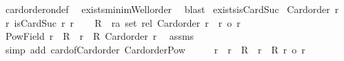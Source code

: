 \begin{isabellebody}
%
\isadelimproof
%
\endisadelimproof
%
\isatagproof
{}\isamarkupfalse%
\ card{\isacharunderscore}{\kern0pt}order{\isacharunderscore}{\kern0pt}on{\isacharunderscore}{\kern0pt}def\ \isamarkupfalse%
\ exists{\isacharunderscore}{\kern0pt}minim{\isacharunderscore}{\kern0pt}Well{\isacharunderscore}{\kern0pt}order\ \isamarkupfalse%
\ blast%
\endisatagproof
{\isafoldproof}%
%
\isadelimproof
\isanewline
%
\endisadelimproof
\isanewline
{}\isamarkupfalse%
\ exists{\isacharunderscore}{\kern0pt}isCardSuc{\isacharcolon}{\kern0pt}\isanewline
{}\ {\isachardoublequoteopen}Card{\isacharunderscore}{\kern0pt}order\ r{\isachardoublequoteclose}\isanewline
{}\ {\isachardoublequoteopen}{\isasymexists}r{\isacharprime}{\kern0pt}{\isachardot}{\kern0pt}\ isCardSuc\ r\ r{\isacharprime}{\kern0pt}{\isachardoublequoteclose}\isanewline
%
\isadelimproof
%
\endisadelimproof
%
\isatagproof
{}\isamarkupfalse%
{\isacharminus}{\kern0pt}\isanewline
\ \ \isamarkupfalse%
\ {\isacharquery}{\kern0pt}R\ {\isacharequal}{\kern0pt}\ {\isachardoublequoteopen}{\isacharbraceleft}{\kern0pt}{\isacharparenleft}{\kern0pt}r{\isacharprime}{\kern0pt}{\isacharcolon}{\kern0pt}{\isacharcolon}{\kern0pt}{\isacharprime}{\kern0pt}a\ set\ rel{\isacharparenright}{\kern0pt}{\isachardot}{\kern0pt}\ Card{\isacharunderscore}{\kern0pt}order\ r{\isacharprime}{\kern0pt}\ {\isasymand}\ r\ {\isacharless}{\kern0pt}o\ r{\isacharprime}{\kern0pt}{\isacharbraceright}{\kern0pt}{\isachardoublequoteclose}\isanewline
\ \ \isamarkupfalse%
\ {\isachardoublequoteopen}{\isacharbar}{\kern0pt}Pow{\isacharparenleft}{\kern0pt}Field\ r{\isacharparenright}{\kern0pt}{\isacharbar}{\kern0pt}\ {\isasymin}\ {\isacharquery}{\kern0pt}R\ {\isasymand}\ {\isacharparenleft}{\kern0pt}{\isasymforall}r\ {\isasymin}\ {\isacharquery}{\kern0pt}R{\isachardot}{\kern0pt}\ Card{\isacharunderscore}{\kern0pt}order\ r{\isacharparenright}{\kern0pt}{\isachardoublequoteclose}\ \isamarkupfalse%
\ assms\isanewline
\ \ \isamarkupfalse%
\ {\isacharparenleft}{\kern0pt}simp\ add{\isacharcolon}{\kern0pt}\ card{\isacharunderscore}{\kern0pt}of{\isacharunderscore}{\kern0pt}Card{\isacharunderscore}{\kern0pt}order\ Card{\isacharunderscore}{\kern0pt}order{\isacharunderscore}{\kern0pt}Pow{\isacharparenright}{\kern0pt}\isanewline
\ \ \isamarkupfalse%
\ \isamarkupfalse%
\ r\ \ {\isachardoublequoteopen}r\ {\isasymin}\ {\isacharquery}{\kern0pt}R\ {\isasymand}\ {\isacharparenleft}{\kern0pt}{\isasymforall}r{\isacharprime}{\kern0pt}\ {\isasymin}\ {\isacharquery}{\kern0pt}R{\isachardot}{\kern0pt}\ r\ {\isasymle}o\ r{\isacharprime}{\kern0pt}{\isacharparenright}{\kern0pt}{\isachardoublequoteclose}\isanewline

\end{isabellebody}
